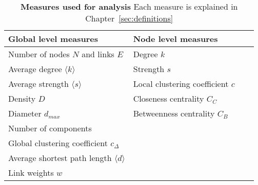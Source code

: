 \begin{table}
\small
\centering
\caption[Measures used for analysis]{\textbf{Measures used for analysis} Each measure is explained in Chapter~\ref{sec:definitions}}
\vspace*{5mm}
\begin{tabularx}{\textwidth}{p{0.5\linewidth}p{0.5\linewidth}}
\toprule
\textbf{Global level measures} & \textbf{Node level measures}\\
\midrule
Number of nodes $N$ and links $E$ & Degree $k$ \\
Average degree $\langle k \rangle$ &  Strength $s$\\
Average strength $\langle s \rangle$ &   Local clustering coefficient $c$\\
Density $D$ & Closeness centrality $C_C$ \\
Diameter $d_{max}$ & Betweenness centrality $C_B$\\
Number of components & \\
Global clustering coefficient $c_{\Delta}$ &  \\
Average shortest path length $\langle d \rangle$ & \\
Link weights $w$ & \\

\bottomrule
\end{tabularx}
\label{tab:netprop}
\end{table}
